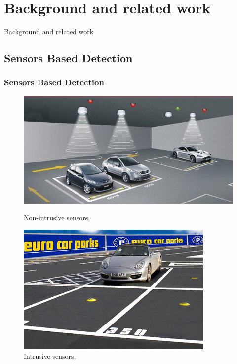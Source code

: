 \documentclass{beamer}
\begin{document}
\section{Background and related work}

\begin{frame}
\Huge Background and related work
\end{frame}

\subsection{Sensors Based Detection}

\begin{frame}
\frametitle{Sensors Based Detection}

\begin{figure}[!htbp]
  \centering
  \begin{minipage}[b]{0.5\textwidth}
    \includegraphics[width=\textwidth]{Pictures/overhead}
    \caption{Non-intrusive sensors, \cite{overhead}}
    \label{nonintru}
  \end{minipage}
  \hfill
  \begin{minipage}[b]{0.4\textwidth}
    \includegraphics[width=\textwidth]{Pictures/sensor}
    \caption{Intrusive sensors, \cite{ground}}
    \label{intru}
  \end{minipage}
\end{figure}

\end{frame}
\end{document}
